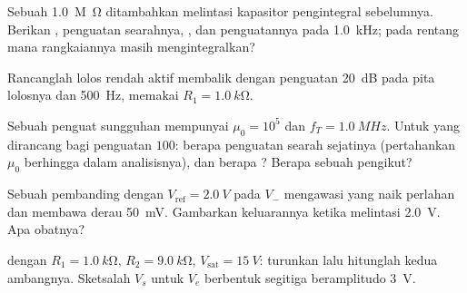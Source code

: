 \begin{exercise}[$\star\star$]\label{exo:b1:operational-amplifier:7}
Sebuah  \qty{1.0}{M\ohm} ditambahkan melintasi kapasitor
pengintegral sebelumnya. Berikan , penguatan searahnya,
, dan penguatannya pada \qty{1.0}{kHz}; pada rentang
mana rangkaiannya masih mengintegralkan?
\end{exercise}

\begin{exercise}[$\star\star$]\label{exo:b1:operational-amplifier:8}
Rancanglah lolos rendah aktif membalik dengan penguatan \qty{20}{dB}
pada pita lolosnya dan  \qty{500}{Hz}, memakai $R_1 = \qty{1.0}{k\ohm}$.
\end{exercise}

\begin{exercise}[$\star\star$]\label{exo:b1:operational-amplifier:9}
Sebuah penguat sungguhan mempunyai $\mu_0 = 10^5$ dan $f_T = \qty{1.0}{MHz}$.
Untuk  yang dirancang bagi penguatan $100$: berapa
penguatan searah sejatinya (pertahankan $\mu_0$ berhingga dalam
analisisnya), dan berapa ? Berapa  sebuah pengikut?
\end{exercise}

\begin{exercise}[$\star\star\star$]\label{exo:b1:operational-amplifier:10}
Sebuah pembanding dengan $V_{\mathrm{ref}} = \qty{2.0}{V}$ pada $V_-$
mengawasi  yang naik perlahan dan membawa derau \qty{50}{mV}.
Gambarkan keluarannya ketika  melintasi \qty{2.0}{V}. Apa obatnya?
\end{exercise}

\begin{exercise}[$\star\star\star$]\label{exo:b1:operational-amplifier:11}
 dengan $R_1 = \qty{1.0}{k\ohm}$, $R_2 = \qty{9.0}{k\ohm}$,
$V_{\mathrm{sat}} = \qty{15}{V}$: turunkan lalu hitunglah kedua ambangnya.
Sketsalah $V_s$ untuk $V_e$ berbentuk segitiga beramplitudo \qty{3}{V}.
\end{exercise}

